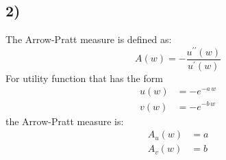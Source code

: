 \documentclass{article}
\begin{document}
	\subsection*{2)} The Arrow-Pratt measure is defined as:
	\begin{equation}
		A(w) = -\frac{u^{\prime\prime}(w)}{u^{\prime}(w)}
	\end{equation}
	For utility function that has the form
	\begin{equation}
		\begin{aligned}
			u(w) & = -e^{-a\,w} \\
			v(w) & = -e^{-b\,w}
		\end{aligned}
	\end{equation}
	the Arrow-Pratt measure is:
	\begin{equation}
		\begin{aligned}
			A_{u}(w) & = a \\
			A_{v}(w) & = b
		\end{aligned}
	\end{equation}
\end{document}
